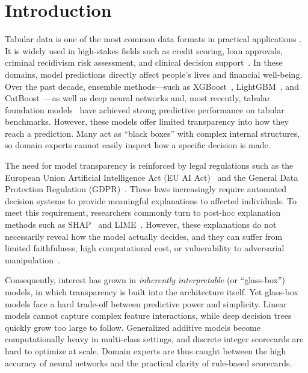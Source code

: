 \section{Introduction}
\label{sec:introduction}

Tabular data is one of the most common data formats in practical applications \cite{Lee2024,Mahendra2026}. It is widely used in high-stakes fields such as credit scoring, loan approvals, criminal recidivism risk assessment, and clinical decision support~\cite{rudin2019stop,caruana2015intelligible,zeng2017interpretable}. In these domains, model predictions directly affect people's lives and financial well-being. Over the past decade, ensemble methods---such as XGBoost~\cite{chen2016xgboost}, LightGBM~\cite{ke2017lightgbm}, and CatBoost~\cite{prokhorenkova2018catboost}---as well as deep neural networks and, most recently, tabular foundation models~\cite{hollmann2025tabpfn} have achieved strong predictive performance on tabular benchmarks. However, these models offer limited transparency into how they reach a prediction. Many act as ``black boxes'' with complex internal structures, so domain experts cannot easily inspect how a specific decision is made.

The need for model transparency is reinforced by legal regulations such as the European Union Artificial Intelligence Act (EU AI Act)~\cite{eu2024ai} and the General Data Protection Regulation (GDPR)~\cite{wachter2017counterfactual}. These laws increasingly require automated decision systems to provide meaningful explanations to affected individuals. To meet this requirement, researchers commonly turn to post-hoc explanation methods such as SHAP~\cite{lundberg2017unified} and LIME~\cite{ribeiro2016why}. However, these explanations do not necessarily reveal how the model actually decides, and they can suffer from limited faithfulness, high computational cost, or vulnerability to adversarial manipulation~\cite{rudin2019stop,slack2020fooling}.

Consequently, interest has grown in \emph{inherently interpretable} (or ``glass-box'') models, in which transparency is built into the architecture itself. Yet glass-box models face a hard trade-off between predictive power and simplicity. Linear models cannot capture complex feature interactions, while deep decision trees quickly grow too large to follow. Generalized additive models become computationally heavy in multi-class settings, and discrete integer scorecards are hard to optimize at scale. Domain experts are thus caught between the high accuracy of neural networks and the practical clarity of rule-based scorecards.


